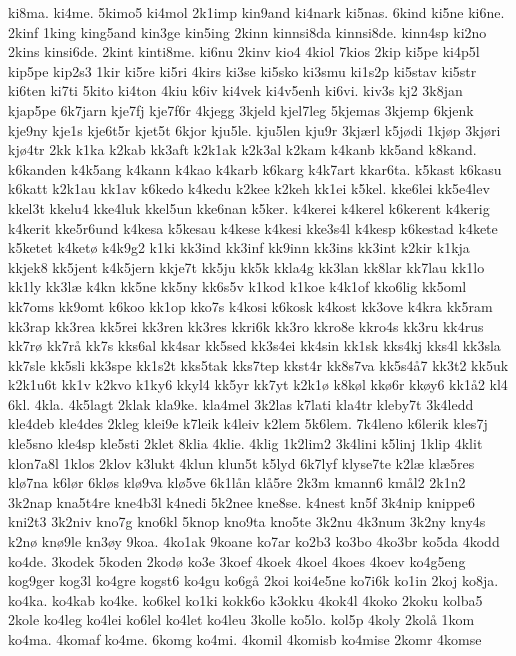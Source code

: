 {ki8ma.
ki4me.
5kimo5
ki4mol
2k1imp
kin9and
ki4nark
ki5nas.
6kind
ki5ne
ki6ne.
2kinf
1king
king5and
kin3ge
kin5ing
2kinn
kinnsi8da
kinnsi8de.
kinn4sp
ki2no
2kins
kinsi6de.
2kint
kinti8me.
ki6nu
2kinv
kio4
4kiol
7kios
2kip
ki5pe
ki4p5l
kip5pe
kip2s3
1kir
ki5re
ki5ri
4kirs
ki3se
ki5sko
ki3smu
ki1s2p
ki5stav
ki5str
ki6ten
ki7ti
5kito
ki4ton
4kiu
k6iv
ki4vek
ki4v5enh
ki6vi.
kiv3s
kj2
3k8jan
kjap5pe
6k7jarn
kje7fj
kje7f6r
4kjegg
3kjeld
kjel7leg
5kjemas
3kjemp
6kjenk
kje9ny
kje1s
kje6t5r
kjet5t
6kjor
kju5le.
kju5len
kju9r
3kj^^e6rl
k5j^^f8di
1kj^^f8p
3kj^^f8ri
kj^^f84tr
2kk
k1ka
k2kab
kk3aft
k2k1ak
k2k3al
k2kam
k4kanb
kk5and
k8kand.
k6kanden
k4k5ang
k4kann
k4kao
k4karb
k6karg
k4k7art
kkar6ta.
k5kast
k6kasu
k6katt
k2k1au
kk1av
k6kedo
k4kedu
k2kee
k2keh
kk1ei
k5kel.
kke6lei
kk5e4lev
kkel3t
kkelu4
kke4luk
kkel5un
kke6nan
k5ker.
k4kerei
k4kerel
k6kerent
k4kerig
k4kerit
kke5r6und
k4kesa
k5kesau
k4kese
k4kesi
kke3s4l
k4kesp
k6kestad
k4kete
k5ketet
k4ket^^f8
k4k9g2
k1ki
kk3ind
kk3inf
kk9inn
kk3ins
kk3int
k2kir
k1kja
kkjek8
kk5jent
k4k5jern
kkje7t
kk5ju
kk5k
kkla4g
kk3lan
kk8lar
kk7lau
kk1lo
kk1ly
kk3l^^e6
k4kn
kk5ne
kk5ny
kk6s5v
k1kod
k1koe
k4k1of
kko6lig
kk5oml
kk7oms
kk9omt
k6koo
kk1op
kko7s
k4kosi
k6kosk
k4kost
kk3ove
k4kra
kk5ram
kk3rap
kk3rea
kk5rei
kk3ren
kk3res
kkri6k
kk3ro
kkro8e
kkro4s
kk3ru
kk4rus
kk7r^^f8
kk7r^^e5
kk7s
kks6al
kk4sar
kk5sed
kk3s4ei
kk4sin
kk1sk
kks4kj
kks4l
kk3sla
kk7sle
kk5sli
kk3spe
kk1s2t
kks5tak
kks7tep
kkst4r
kk8s7va
kk5s4^^e57
kk3t2
kk5uk
k2k1u6t
kk1v
k2kvo
k1ky6
kkyl4
kk5yr
kk7yt
k2k1^^f8
k8k^^f8l
kk^^f86r
kk^^f8y6
kk1^^e52
kl4
6kl.
4kla.
4k5lagt
2klak
kla9ke.
kla4mel
3k2las
k7lati
kla4tr
kleby7t
3k4ledd
kle4deb
kle4des
2kleg
klei9e
k7leik
k4leiv
k2lem
5k6lem.
7k4leno
k6lerik
kles7j
kle5sno
kle4sp
kle5sti
2klet
8klia
4klie.
4klig
1k2lim2
3k4lini
k5linj
1klip
4klit
klon7a8l
1klos
2klov
k3lukt
4klun
klun5t
k5lyd
6k7lyf
klyse7te
k2l^^e6
kl^^e65res
kl^^f87na
k6l^^f8r
6kl^^f8s
kl^^f89va
kl^^f85ve
6k1l^^e5n
kl^^e55re
2k3m
kmann6
km^^e5l2
2k1n2
3k2nap
kna5t4re
kne4b3l
k4nedi
5k2nee
kne8se.
k4nest
kn5f
3k4nip
knippe6
kni2t3
3k2niv
kno7g
kno6kl
5knop
kno9ta
kno5te
3k2nu
4k3num
3k2ny
kny4s
k2n^^f8
kn^^f89le
kn3^^f8y
9koa.
4ko1ak
9koane
ko7ar
ko2b3
ko3bo
4ko3br
ko5da
4kodd
ko4de.
3kodek
5koden
2kod^^f8
ko3e
3koef
4koek
4koel
4koes
4koev
ko4g5eng
kog9ger
kog3l
ko4gre
kogst6
ko4gu
ko6g^^e5
2koi
koi4e5ne
ko7i6k
ko1in
2koj
ko8ja.
ko4ka.
ko4kab
ko4ke.
ko6kel
ko1ki
kokk6o
k3okku
4kok4l
4koko
2koku
kolba5
2kole
ko4leg
ko4lei
ko6lel
ko4let
ko4leu
3kolle
ko5lo.
kol5p
4koly
2kol^^e5
1kom
ko4ma.
4komaf
ko4me.
6komg
ko4mi.
4komil
4komisb
ko4mise
2komr
4komse
}
